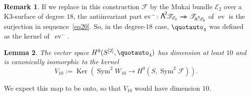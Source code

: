 \documentclass[JEP,XML,SOM,Unicode, NoEqCountersInSection,NoFloatCountersInSection]{cedram}
\let\mathcal\mathscr
\newcommand{\onto}{\mathchoice{\to\hspace*{-5mm}\to}{\to\hspace*{-2.85mm}\to}{\to\hspace*{-3mm}\to}{\to\hspace*{-3mm}\to}}
\newtheorem{lemm}{Lemma}[section]
\theoremstyle{definition}
\newtheorem{rema}[lemm]{Remark}
\newcommand\cE{\mathcal{E}}
\newcommand\cF{\mathcal{F}}
\newcommand\cT{\mathcal{T}}
\DeclareMathOperator{\ev}{ev}
\DeclareMathOperator{\Ker}{Ker}
\DeclareMathOperator{\Sym}{Sym}
\newcommand\bw[1]{{\hbox{\large$\mathsf{\Lambda}$}^{\!#1}}}
\newcommand\sbw[2]{{{\mathsf{\Lambda}}^{^{\scriptscriptstyle#1}}{#2}}}
\newcommand\Tauto[1]{\cT_{#1}}
\newcommand\hilbS{S^{[2]}}
\begin{document}
\begin{rema}\label{analogieD18}
If we replace in this construction $\cF$ by the Mukai bundle $\cE_2$ over a K3-surface of
degree $18$, the antiinvariant part
$
\ev^-\colon \bw2\! \Tauto{\cE_2} \onto \Tauto{\sbw2{\!\cE_2}}
$ of $\ev$ is the surjection in sequence~\eqref{eq20}. So, in the
degree-$18$ case, $\quotauto_4$ was defined as the kernel of~$\ev^-$.
\end{rema}

\begin{lemm}
The vector space $H^0(\hilbS, \quotauto_4)$ has dimension {at least} $10$ and is canonically isomorphic to the kernel
\[
V_{10} := \Ker ( \Sym^2\!W_{10} \to H^0(S,\Sym^2\!\cF )).
\]
\end{lemm}

{We expect this map to be onto, so that $ V_{10}$ would have dimension $10$}.
\end{document}
